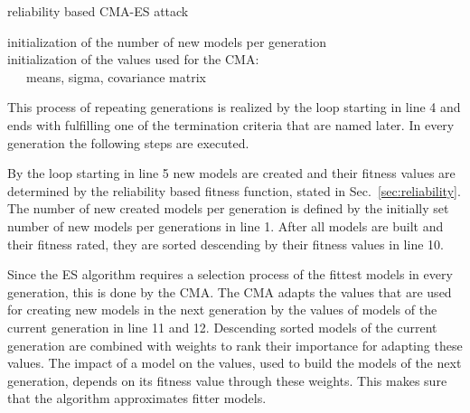 \SetAlCapHSkip{0.2em}
\begin{algorithm}[H] %
\Indm
\SetAlgoLined
\caption{reliability based \acl{CMA-ES} attack}
\label{alg:cma-es}
\Indp

initialization of the number of new models per generation\\
initialization of the values used for the \ac{CMA}:\\
\ \ \ means, sigma, covariance matrix\\
\end{algorithm}

This process of repeating generations is realized by the loop starting in line 4 and ends with fulfilling one of the termination criteria that are named later.
In every generation the following steps are executed.

By the loop starting in line 5 new models are created and their fitness values are determined by the reliability based fitness function, stated in Sec.\ \ref{sec:reliability}. %
The number of new created models per generation is defined by the initially set number of new models per generations in line 1.
After all models are built and their fitness rated, they are sorted descending by their fitness values in line 10.

Since the \ac{ES} algorithm requires a selection process of the fittest models in every generation, this is done by the \ac{CMA}.
The \ac{CMA} adapts the values that are used for creating new models in the next generation by the values of models of the current generation in line 11 and 12. %
Descending sorted models of the current generation are combined with weights to rank their importance for adapting these values.
The impact of a model on the values, used to build the models of the next generation, depends on its fitness value through these weights.
This makes sure that the algorithm approximates fitter models.


